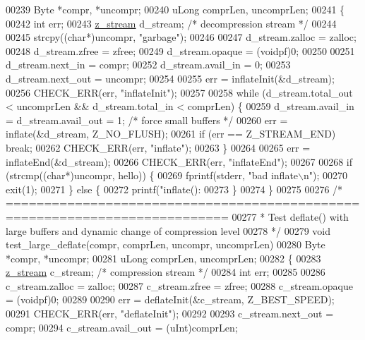 \begin{DoxyCode}
{{{{{{{{{{{00239     Byte *compr, *uncompr;
00240     uLong comprLen, uncomprLen;
00241 \{
00242     \textcolor{keywordtype}{int} err;
00243     \hyperlink{structz__stream__s}{z\_stream} d\_stream; \textcolor{comment}{/* decompression stream */}
00244 
00245     strcpy((\textcolor{keywordtype}{char}*)uncompr, \textcolor{stringliteral}{"garbage"});
00246 
00247     d\_stream.zalloc = zalloc;
00248     d\_stream.zfree = zfree;
00249     d\_stream.opaque = (voidpf)0;
00250 
00251     d\_stream.next\_in  = compr;
00252     d\_stream.avail\_in = 0;
00253     d\_stream.next\_out = uncompr;
00254 
00255     err = inflateInit(&d\_stream);
00256     CHECK\_ERR(err, \textcolor{stringliteral}{"inflateInit"});
00257 
00258     \textcolor{keywordflow}{while} (d\_stream.total\_out < uncomprLen && d\_stream.total\_in < comprLen) \{
00259         d\_stream.avail\_in = d\_stream.avail\_out = 1; \textcolor{comment}{/* force small buffers */}
00260         err = inflate(&d\_stream, Z\_NO\_FLUSH);
00261         \textcolor{keywordflow}{if} (err == Z\_STREAM\_END) \textcolor{keywordflow}{break};
00262         CHECK\_ERR(err, \textcolor{stringliteral}{"inflate"});
00263     \}
00264 
00265     err = inflateEnd(&d\_stream);
00266     CHECK\_ERR(err, \textcolor{stringliteral}{"inflateEnd"});
00267 
00268     \textcolor{keywordflow}{if} (strcmp((\textcolor{keywordtype}{char}*)uncompr, hello)) \{
00269         fprintf(stderr, \textcolor{stringliteral}{"bad inflate\(\backslash\)n"});
00270         exit(1);
00271     \} \textcolor{keywordflow}{else} \{
00272         printf(\textcolor{stringliteral}{"inflate(): %
00273     \}
00274 \}
00275 
00276 \textcolor{comment}{/* ===========================================================================}
00277 \textcolor{comment}{ * Test deflate() with large buffers and dynamic change of compression level}
00278 \textcolor{comment}{ */}
00279 \textcolor{keywordtype}{void} test\_large\_deflate(compr, comprLen, uncompr, uncomprLen)
00280     Byte *compr, *uncompr;
00281     uLong comprLen, uncomprLen;
00282 \{
00283     \hyperlink{structz__stream__s}{z\_stream} c\_stream; \textcolor{comment}{/* compression stream */}
00284     \textcolor{keywordtype}{int} err;
00285 
00286     c\_stream.zalloc = zalloc;
00287     c\_stream.zfree = zfree;
00288     c\_stream.opaque = (voidpf)0;
00289 
00290     err = deflateInit(&c\_stream, Z\_BEST\_SPEED);
00291     CHECK\_ERR(err, \textcolor{stringliteral}{"deflateInit"});
00292 
00293     c\_stream.next\_out = compr;
00294     c\_stream.avail\_out = (uInt)comprLen;
}}}}}}}}}}}}
\end{DoxyCode}
